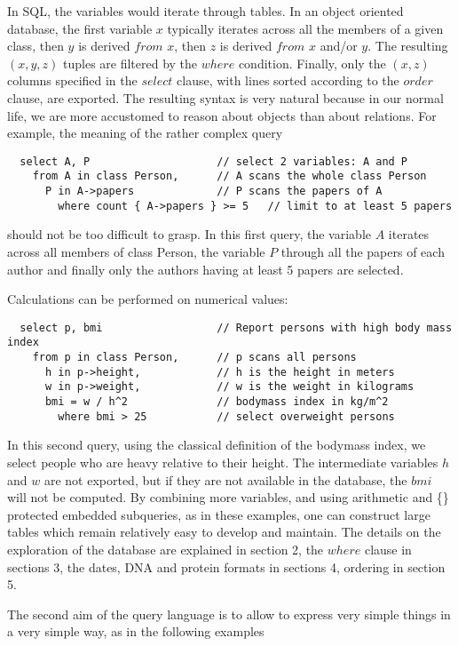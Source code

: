 \documentclass[11pt]{article}
\newcommand{\BL}{\begin{lstlisting}}
\begin{document}
In SQL, the variables would iterate through tables. In an object oriented database, the first variable $x$ 
typically iterates across all the members of a given class, then $y$ is derived $from$ $x$, then $z$ is
derived $from$ $x$ and/or $y$. The resulting $(x, y, z)$ tuples are filtered by the $where$ condition. 
Finally, only the $(x,z)$ columns specified in the $select$ clause, with lines sorted according to the $order$
clause, are exported. The resulting syntax is very natural because in our normal life, we are more accustomed
to reason about objects than about relations. For example, the meaning of the rather complex query
\BL
  select A, P                    // select 2 variables: A and P
    from A in class Person,      // A scans the whole class Person
      P in A->papers             // P scans the papers of A           
        where count { A->papers } >= 5   // limit to at least 5 papers
\end{lstlisting}
should not be too difficult to grasp. In this first query, the variable $A$ iterates across all members of class Person,
the variable $P$ through all the papers of each author and finally only the authors having at least 5 papers
are selected. 

Calculations can be performed on numerical values:
\BL
  select p, bmi                  // Report persons with high body mass index
    from p in class Person,      // p scans all persons
      h in p->height,            // h is the height in meters
      w in p->weight,            // w is the weight in kilograms   
      bmi = w / h^2              // bodymass index in kg/m^2
        where bmi > 25           // select overweight persons
\end{lstlisting}
In this second query, using the classical definition of the
bodymass index, we select people who are heavy relative to their height. 
The intermediate variables $h$ and $w$ are not exported, but if they are not available
in the database, the $bmi$ will not be computed.
By combining more variables, and using arithmetic and \{\} protected embedded subqueries,
as in these examples, one can construct large tables which remain relatively easy to develop and maintain.
The details on the exploration of the database are explained in section 2, the $where$ clause in sections 3,
the dates, DNA and protein formats in sections 4, ordering in section 5.

The second aim of the query language is to allow to express very simple things in a very simple way,
as in the following examples
\end{document}
